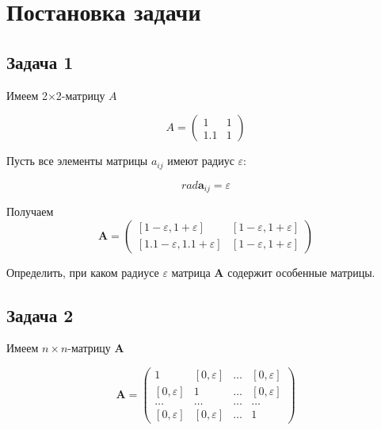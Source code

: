 
\usepackage{amsmath}

\lstset{language=Java} 




\renewcommand\contentsname{\centerline{Содержание}}
\tableofcontents
\newpage


\section{Постановка задачи}

\subsection{Задача 1}

Имеем 2$\times$2-матрицу $A$

\begin{equation}
	A = \begin{pmatrix}
		1 & 1 \\
		1.1 & 1
		\end{pmatrix}
\end{equation}

Пусть все элементы матрицы $a_{ij}$ имеют радиус $\varepsilon$:

\begin{equation}
	rad \textbf{a}_{ij} = \varepsilon
\end{equation}

Получаем 
\begin{equation}
	\textbf{A} = \begin{pmatrix}
		[1 - \varepsilon, 1 + \varepsilon] & [1 - \varepsilon, 1 + \varepsilon] \\
		[1.1 - \varepsilon, 1.1 + \varepsilon] & [1 - \varepsilon, 1 + \varepsilon]
	\end{pmatrix}
\end{equation}

Определить, при каком радиусе $\varepsilon$ матрица $\textbf{A}$ содержит особенные матрицы.

\subsection{Задача 2}

Имеем $n \times n$-матрицу $\textbf{A}$ 

\begin{equation}
	\textbf{A} = \begin{pmatrix}
		1 & [0,\varepsilon] & \dots & [0,\varepsilon] \\
		[0,\varepsilon] & 1 & \dots & [0,\varepsilon] \\
		\dots & \dots & \dots & \dots \\
		[0,\varepsilon] & [0,\varepsilon] & \dots & 1 
	\end{pmatrix}
\end{equation}

